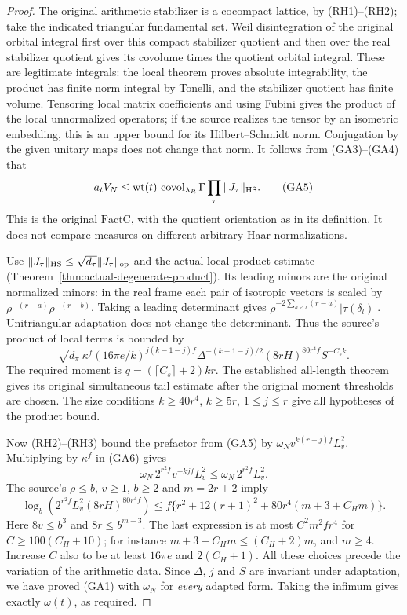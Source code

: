 \begin{proof}
The original arithmetic stabilizer is a cocompact lattice, by
(RH1)--(RH2); take the indicated triangular fundamental set.
Weil disintegration of the original orbital integral first over
this compact stabilizer quotient and then over the real stabilizer
quotient gives its covolume times the quotient orbital integral.
These are legitimate integrals: the local theorem proves absolute
integrability, the product has finite norm integral by Tonelli, and
the stabilizer quotient has finite volume. Tensoring local matrix
coefficients and using Fubini gives the product of the local
unnormalized operators; if the source realizes the tensor by an
isometric embedding, this is an upper bound for its
Hilbert--Schmidt norm. Conjugation by the given unitary maps does
not change that norm. It follows from (GA3)--(GA4) that
\[
 a_t V_N
  \le \mathrm{wt}(t)\,
     \operatorname{covol}_{\lambda_R}\Gamma
                  \prod_\tau\|J_\tau\|_{\rm HS}.
 \tag{GA5}
\]
This is the original \(\mathrm{FactC}\), with the quotient
orientation as in its definition. It does not compare measures
on different arbitrary Haar normalizations.

Use \(\|J_\tau\|_{\rm HS}\le\sqrt{d_\tau}\|J_\tau\|_{\rm op}\)
and the actual local-product estimate
(Theorem~\ref{thm:actual-degenerate-product}). Its leading
minors are the original normalized minors: in the real frame
each pair of isotropic vectors is scaled by
\(\rho^{-(r-a)}\rho^{-(r-b)}\). Taking a leading determinant gives
\(\rho^{-2\sum_{a<l}(r-a)}|\tau(\delta_l)|\). Unitriangular
adaptation does not change the determinant.
Thus the source's product of local terms is bounded by
\[
 \sqrt{d_\pi}\,\kappa^f
 (16\pi e/k)^{j(k-1-j)f}\Delta^{-(k-1-j)/2}
 (8rH)^{80r^4f}S^{-C_sk}.
 \tag{GA6}
\]
The required moment is \(q=(\lceil C_s\rceil+2)kr\).
The established all-length theorem gives its original
simultaneous tail estimate after the original moment thresholds
are chosen. The size conditions \(k\ge40r^4\), \(k\ge5r\),
\(1\le j\le r\) give all hypotheses of the product bound.

Now (RH2)--(RH3) bound the prefactor from (GA5) by
\(\omega_N v^{k(r-j)f}L_v^2\). Multiplying by \(\kappa^f\) in
(GA6) gives
\[
      \omega_N\,2^{r^2f}v^{-kjf}L_v^2
        \le \omega_N\,2^{r^2f}L_v^2 .
\]
The source's \(\rho\le b\), \(v\ge1\), \(b\ge2\) and
\(m=2r+2\) imply
\[
 \log_b\!\left(2^{r^2f}L_v^2(8rH)^{80r^4f}\right)
 \le f\{r^2+12(r+1)^2+
                  80r^4(m+3+C_Hm)\}.
\]
Here \(8v\le b^3\) and \(8r\le b^{m+3}\).
The last expression is at most \(C^2m^2fr^4\) for
\(C\ge100(C_H+10)\); for instance
\(m+3+C_Hm\le(C_H+2)m\), and \(m\ge4\).
Increase \(C\) also to be at least \(16\pi e\) and
\(2(C_H+1)\). All these choices precede the variation
of the arithmetic data. Since \(\Delta\), \(j\) and \(S\)
are invariant under adaptation, we have proved (GA1)
with \(\omega_N\) for \emph{every} adapted form. Taking the
infimum gives exactly \(\omega(t)\), as required.
\end{proof}

